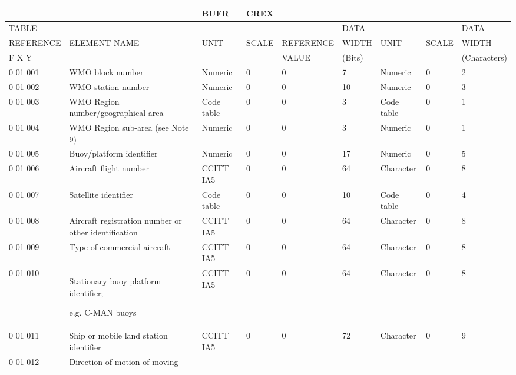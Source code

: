 \begin{longtable}[]{@{}lllllllll@{}}
\toprule
& & BUFR & CREX & & & & &\tabularnewline
\midrule
\endhead
TABLE & & & & & DATA & & & DATA\tabularnewline
REFERENCE & ELEMENT NAME & UNIT & SCALE & REFERENCE & WIDTH & UNIT & SCALE & WIDTH\tabularnewline
F X Y & & & & VALUE & (Bits) & & & (Characters)\tabularnewline
0 01 001 & WMO block number & Numeric & 0 & 0 & 7 & Numeric & 0 & 2\tabularnewline
0 01 002 & WMO station number & Numeric & 0 & 0 & 10 & Numeric & 0 & 3\tabularnewline
0 01 003 & WMO Region number/geographical area & Code table & 0 & 0 & 3 & Code table & 0 & 1\tabularnewline
0 01 004 & WMO Region sub-area (see Note 9) & Numeric & 0 & 0 & 3 & Numeric & 0 & 1\tabularnewline
0 01 005 & Buoy/platform identifier & Numeric & 0 & 0 & 17 & Numeric & 0 & 5\tabularnewline
0 01 006 & Aircraft flight number & CCITT IA5 & 0 & 0 & 64 & Character & 0 & 8\tabularnewline
0 01 007 & Satellite identifier & Code table & 0 & 0 & 10 & Code table & 0 & 4\tabularnewline
0 01 008 & Aircraft registration number or other identification & CCITT IA5 & 0 & 0 & 64 & Character & 0 & 8\tabularnewline
0 01 009 & Type of commercial aircraft & CCITT IA5 & 0 & 0 & 64 & Character & 0 & 8\tabularnewline
\begin{minipage}[t]{0.08\columnwidth}\raggedright
0 01 010\strut
\end{minipage} & \begin{minipage}[t]{0.08\columnwidth}\raggedright
Stationary buoy platform identifier;

e.g. C-MAN buoys\strut
\end{minipage} & \begin{minipage}[t]{0.08\columnwidth}\raggedright
CCITT IA5\strut
\end{minipage} & \begin{minipage}[t]{0.08\columnwidth}\raggedright
0\strut
\end{minipage} & \begin{minipage}[t]{0.08\columnwidth}\raggedright
0\strut
\end{minipage} & \begin{minipage}[t]{0.08\columnwidth}\raggedright
64\strut
\end{minipage} & \begin{minipage}[t]{0.08\columnwidth}\raggedright
Character\strut
\end{minipage} & \begin{minipage}[t]{0.08\columnwidth}\raggedright
0\strut
\end{minipage} & \begin{minipage}[t]{0.08\columnwidth}\raggedright
8\strut
\end{minipage}\tabularnewline
0 01 011 & Ship or mobile land station identifier & CCITT IA5 & 0 & 0 & 72 & Character & 0 & 9\tabularnewline
\begin{minipage}[t]{0.08\columnwidth}\raggedright
0 01 012\strut
\end{minipage} & \begin{minipage}[t]{0.08\columnwidth}\raggedright
Direction of motion of moving


\end{minipage}
\end{longtable}
